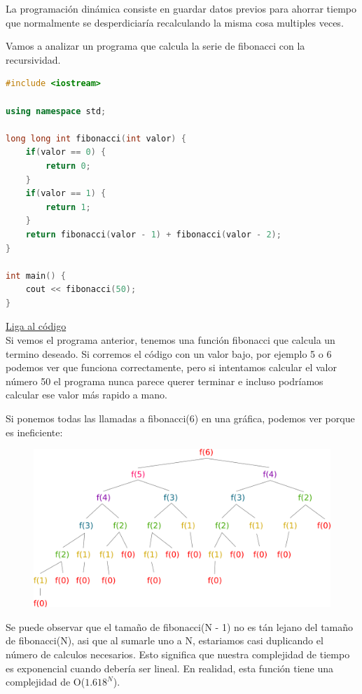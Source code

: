 \documentclass{article}
\begin{document}
La programación dinámica consiste en guardar datos previos para ahorrar tiempo que normalmente se desperdiciaría recalculando la misma cosa multiples veces.

Vamos a analizar un programa que calcula la serie de fibonacci con la recursividad.

\begin{lstlisting}[language=C++, title=Fibonacci]
#include <iostream>

using namespace std;

long long int fibonacci(int valor) {
	if(valor == 0) {
		return 0;
	}
	if(valor == 1) {
		return 1;
	}
	return fibonacci(valor - 1) + fibonacci(valor - 2);
}

int main() {
	cout << fibonacci(50);
}
\end{lstlisting}
\href{https://repl.it/@Jamesscn/Fibonacci}{Liga al código} \\

Si vemos el programa anterior, tenemos una función fibonacci que calcula un termino deseado. Si corremos el código con un valor bajo, por ejemplo 5 o 6 podemos ver que funciona correctamente, pero si intentamos calcular el valor número 50 el programa nunca parece querer terminar e incluso podríamos calcular ese valor más rapido a mano.

Si ponemos todas las llamadas a fibonacci(6) en una gráfica, podemos ver porque es ineficiente:

\begin{figure}[H]
    \centering
    \includegraphics[width=0.4\paperwidth]{fibonacci}
\end{figure}

Se puede observar que el tamaño de fibonacci(N - 1) no es tán lejano del tamaño de fibonacci(N), asi que al sumarle uno a N, estariamos casi duplicando el número de calculos necesarios. Esto significa que nuestra complejidad de tiempo es exponencial cuando debería ser lineal. En realidad, esta función tiene una complejidad de O($1.618^N$).
\end{document}
